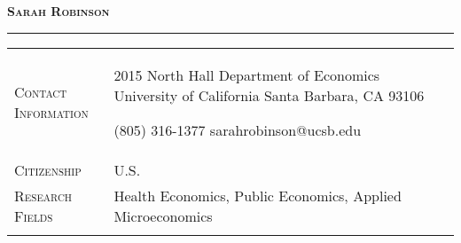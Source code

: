 \documentclass[11pt]{article}
\begin{document}
\thispagestyle{firstpage}

\begin{center}
	\vspace*{-15pt}
	{\huge\textsc{\textbf{Sarah Robinson}}} \\[2pt]
\end{center}

\vspace{-6pt}

\noindent\rule{\textwidth}{1pt}

\vspace{3pt}

\begin{tabularx}{\textwidth}{@{}Y Z@{}}
	
	\textsc{Contact \newline Information} & 
	\begin{minipage}[t]{0.35\textwidth}
		2015 North Hall \newline
		Department of Economics \newline
		University of California \newline
		Santa Barbara, CA 93106
	\end{minipage}\begin{minipage}[t]{0.4\textwidth}
	 (805) 316-1377 \newline
	 sarahrobinson@ucsb.edu \newline
	 \href{https://www.s-robinson.com}{\color{blue}{www.s-robinson.com}}
	\end{minipage}
	\newline  \\ \addlinespace[15pt] 
	
	\textsc{Citizenship} & 
	U.S.
	\\ \addlinespace[20pt] 
	
	\textsc{Research Fields} & 
	Health Economics, Public Economics, Applied Microeconomics
	 \\ \addlinespace[20pt] 
	

\end{tabularx}
\end{document}

